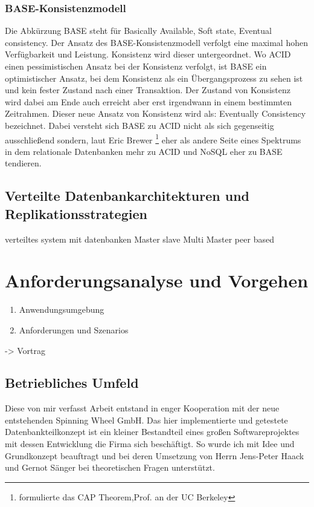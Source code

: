 \documentclass[a4paper,11pt,oneside,%
headsepline,												%
footsepline,												%
bibtotocnumbered									%
]{scrreprt}
\begin{document}
\subsection{BASE-Konsistenzmodell}
Die Abkürzung BASE steht für Basically Available, Soft state, Eventual consistency. Der Ansatz des BASE-Konsistenzmodell verfolgt eine maximal hohen Verfügbarkeit und Leistung. Konsistenz wird dieser untergeordnet. Wo ACID einen pessimistischen Ansatz bei der
Konsistenz verfolgt, ist BASE ein optimistischer Ansatz, bei dem Konsistenz als ein Übergangsprozess zu sehen ist und kein fester Zustand nach einer Transaktion\autocite[33, 34]{Edlich2010}. Der Zustand von Konsistenz wird dabei am Ende auch erreicht aber erst irgendwann in einem bestimmten Zeitrahmen. Dieser neue Ansatz von Konsistenz wird als: Eventually Consistency bezeichnet. Dabei versteht sich BASE zu ACID nicht als sich gegenseitig ausschließend sondern, laut Eric Brewer \footnote{formulierte das CAP Theorem,Prof. an der UC Berkeley} eher als andere Seite eines Spektrums in dem relationale Datenbanken mehr zu ACID und NoSQL eher zu BASE tendieren.
\section{Verteilte Datenbankarchitekturen und Replikationsstrategien}
\label{sec:VertDB}
verteiltes system mit datenbanken %
Master slave
Multi Master
peer based
 
\chapter{Anforderungsanalyse und Vorgehen}
\begin{enumerate}[1.]
			\item Anwendungsumgebung
			\item Anforderungen und Szenarios
		\end{enumerate}
-> Vortrag

\section{Betriebliches Umfeld}
Diese von mir verfasst Arbeit entstand in enger Kooperation mit der neue entstehenden Spinning Wheel GmbH. Das hier implementierte und getestete Datenbankteilkonzept ist ein kleiner Bestandteil eines großen Softwareprojektes mit dessen Entwicklung die Firma sich beschäftigt. So wurde ich mit Idee und Grundkonzept beauftragt und bei deren Umsetzung von Herrn Jens-Peter Haack und Gernot Sänger bei theoretischen Fragen unterstützt.\\
\end{document}

